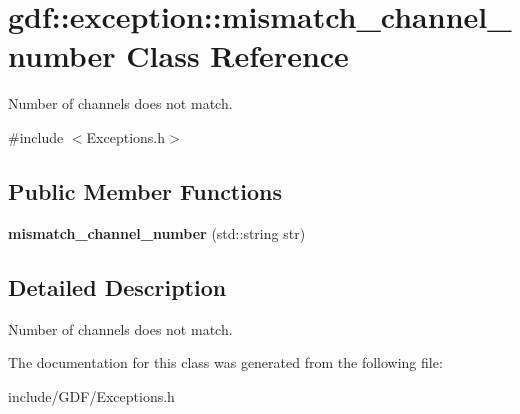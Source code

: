 \hypertarget{classgdf_1_1exception_1_1mismatch__channel__number}{
\section{gdf::exception::mismatch\_\-channel\_\-number Class Reference}
\label{classgdf_1_1exception_1_1mismatch__channel__number}
}


Number of channels does not match.  




{\ttfamily \#include $<$Exceptions.h$>$}

\subsection*{Public Member Functions}
\begin{DoxyCompactItemize}
\item 
\hypertarget{classgdf_1_1exception_1_1mismatch__channel__number_ae918beb7c33758ffe1331d47905693c6}{
{\bfseries mismatch\_\-channel\_\-number} (std::string str)}
\label{classgdf_1_1exception_1_1mismatch__channel__number_ae918beb7c33758ffe1331d47905693c6}

\end{DoxyCompactItemize}


\subsection{Detailed Description}
Number of channels does not match. 

The documentation for this class was generated from the following file:\begin{DoxyCompactItemize}
\item 
include/GDF/Exceptions.h\end{DoxyCompactItemize}
